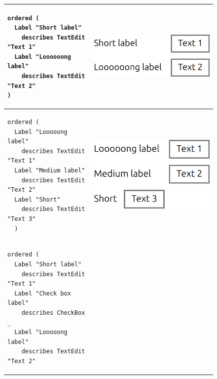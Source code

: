 
\begin{figure}
	\centering
    \begin{tabular}{m{85mm}m{6cm}}
      \begin{lstlisting}[basicstyle=\small]
ordered (
  Label "Short label"
    describes TextEdit "Text 1"
  Label "Loooooong label"
    describes TextEdit "Text 2"
)
      \end{lstlisting} &
      \includegraphics[scale=0.4]{Example1-Qt-QML.png} \\
      \hline
      \begin{lstlisting}[basicstyle=\small]
ordered (
  Label "Looooong label"
    describes TextEdit "Text 1"
  Label "Medium label"
    describes TextEdit "Text 2"
  Label "Short"
    describes TextEdit "Text 3"
  )
      \end{lstlisting} &
      \includegraphics[scale=0.4]{Example2-Qt-QML.png} \\
      \hline
      \begin{lstlisting}[basicstyle=\small]
ordered (
  Label "Short label"
    describes TextEdit "Text 1"
  Label "Check box label"
    describes CheckBox _
  Label "Looooong label"
    describes TextEdit "Text 2"

\end{lstlisting}
\end{tabular}
\end{figure}
